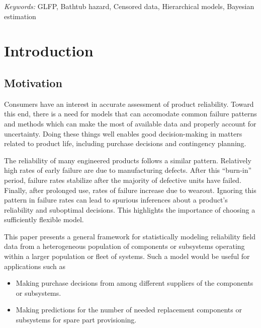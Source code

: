 \documentclass[12pt]{article}
\begin{document}

\noindent%
{\it Keywords:} GLFP, Bathtub hazard, Censored data, Hierarchical models, Bayesian estimation
\vfill

\newpage
{} %


\section{Introduction}
\subsection{Motivation}
Consumers have an interest in accurate assessment of product reliability. Toward this end, there is a need for models that can accomodate common failure patterns and methods which can make the most of available data and properly account for uncertainty. Doing these things well enables good decision-making in matters related to product life, including purchase decisions and contingency planning.

The reliability of many engineered products follows a similar pattern. Relatively high rates of early failure are due to manufacturing defects.  After this ``burn-in'' period, failure rates stabilize after the majority of defective units have failed.  Finally, after prolonged use, rates of failure increase due to wearout.  Ignoring this pattern in failure rates can lead to spurious inferences about a product's reliability and suboptimal decisions. This highlights the importance of choosing a sufficiently flexible model.



This paper presents a general framework for statistically modeling reliability field data from a heterogeneous population of components or subsystems operating within a larger population or fleet of systems. Such a model would be useful for applications such as

\begin{itemize}
\item Making purchase decisions from among different suppliers of the components or subsystems.
\item Making predictions for the number of needed replacement components or subsystems for spare part provisioning.
\end{itemize}
\end{document}
